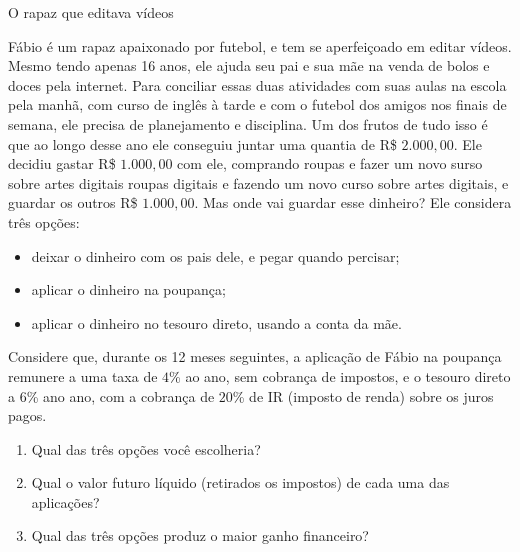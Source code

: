\label{fin-prac-3}

\begin{task}{O rapaz que editava vídeos}
\label{fin-ativ-15}

Fábio é um rapaz apaixonado por futebol, e tem se aperfeiçoado em editar vídeos. Mesmo tendo apenas 16 anos, ele ajuda seu pai e sua mãe na venda de bolos e doces pela internet. Para conciliar essas duas atividades com suas aulas na escola pela manhã, com curso de inglês à tarde e com o futebol dos amigos nos finais de semana, ele precisa de planejamento e disciplina. Um dos frutos de tudo isso é que ao longo desse ano ele conseguiu juntar uma quantia de R\$ $2.000{,}00$. Ele decidiu gastar R\$ $1.000{,}00$ com ele, comprando roupas e fazer um novo surso sobre artes digitais roupas digitais e fazendo um novo curso sobre artes digitais, e guardar os outros R\$ $1.000{,}00$. Mas onde vai guardar esse dinheiro? Ele considera três opções:
\begin{itemize}
  \item deixar o dinheiro com os pais dele, e pegar quando percisar;
  \item aplicar o dinheiro na poupança;
  \item aplicar o dinheiro no tesouro direto, usando a conta da mãe.
\end{itemize}

Considere que, durante os 12 meses seguintes, a aplicação de Fábio na poupança remunere a uma taxa de $4$\% ao ano, sem cobrança de impostos, e o tesouro direto a $6$\% ano ano, com a cobrança de $20$\% de IR (imposto de renda) sobre os juros pagos.

\begin{enumerate}
  \item Qual das três opções você escolheria?
  \item Qual o valor futuro líquido (retirados os impostos) de cada uma das aplicações?
  \item Qual das três opções produz o maior ganho financeiro?
\end{enumerate}
\end{task}

